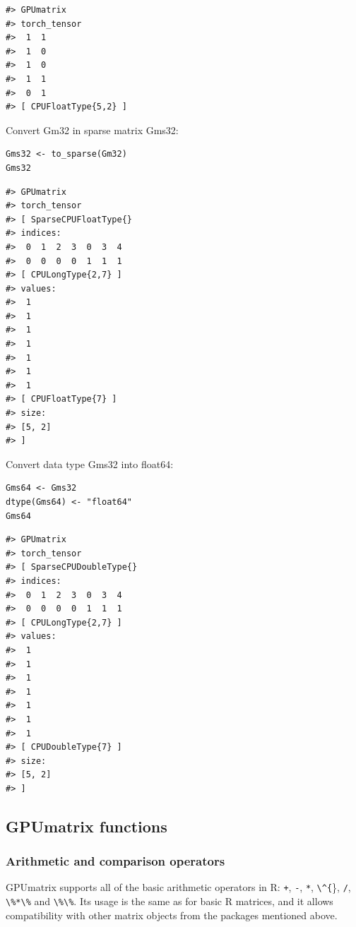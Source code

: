 \begin{verbatim}
#> GPUmatrix
#> torch_tensor
#>  1  1
#>  1  0
#>  1  0
#>  1  1
#>  0  1
#> [ CPUFloatType{5,2} ]
\end{verbatim}

Convert Gm32 in sparse matrix Gms32:

\begin{verbatim}
Gms32 <- to_sparse(Gm32)
Gms32
\end{verbatim}

\begin{verbatim}
#> GPUmatrix
#> torch_tensor
#> [ SparseCPUFloatType{}
#> indices:
#>  0  1  2  3  0  3  4
#>  0  0  0  0  1  1  1
#> [ CPULongType{2,7} ]
#> values:
#>  1
#>  1
#>  1
#>  1
#>  1
#>  1
#>  1
#> [ CPUFloatType{7} ]
#> size:
#> [5, 2]
#> ]
\end{verbatim}

Convert data type Gms32 into float64:

\begin{verbatim}
Gms64 <- Gms32
dtype(Gms64) <- "float64"
Gms64
\end{verbatim}

\begin{verbatim}
#> GPUmatrix
#> torch_tensor
#> [ SparseCPUDoubleType{}
#> indices:
#>  0  1  2  3  0  3  4
#>  0  0  0  0  1  1  1
#> [ CPULongType{2,7} ]
#> values:
#>  1
#>  1
#>  1
#>  1
#>  1
#>  1
#>  1
#> [ CPUDoubleType{7} ]
#> size:
#> [5, 2]
#> ]
\end{verbatim}

\hypertarget{gpumatrix-functions}{%
\subsection{GPUmatrix functions}\label{gpumatrix-functions}}

\hypertarget{arithmetic-and-comparison-operators}{%
\subsubsection{Arithmetic and comparison operators}\label{arithmetic-and-comparison-operators}}

GPUmatrix supports all of the basic arithmetic operators in R: \texttt{+}, \texttt{-}, \texttt{*}, \texttt{\textbackslash{}\^{}\{}\}, \texttt{/}, \texttt{\textbackslash{}\%*\textbackslash{}\%} and \texttt{\textbackslash{}\%\textbackslash{}\%}. Its usage is the same as for basic R matrices, and it allows compatibility with other matrix objects from the packages mentioned above.


